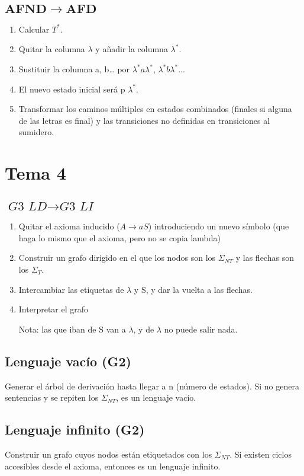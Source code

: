 \documentclass[12pt, twoside, openright]{report} %
\begin{document}
\subsection{$\boldsymbol{AFND \rightarrow AFD}$}
\begin{enumerate}
	\item Calcular $T^*$.
	\item Quitar la columna $\lambda$ y añadir la columna $\lambda^*$.
	\item Sustituir la columna a, b… por $\lambda^* a \lambda^*$, $\lambda^* b \lambda^*$...
	\item El nuevo estado inicial será p $\lambda^*$.
	\item Transformar los caminos múltiples en estados combinados (finales si alguna de las letras es final) y las transiciones no definidas en transiciones al sumidero.
\end{enumerate}

\section{Tema 4}
\subsection{$\boldsymbol{\textit{G3 LD} \rightarrow \textit{G3 LI}}$}
\begin{enumerate}
	\item Quitar el axioma inducido ($A \rightarrow aS$) introduciendo un nuevo símbolo (que haga lo mismo que el axioma, pero no se copia lambda)
	\item Construir un grafo dirigido en el que los nodos son los $\Sigma_{NT}$ y las flechas son los $\Sigma_T$.
	\item Intercambiar las etiquetas de $\lambda$ y S, y dar la vuelta a las flechas.
	\item Interpretar el grafo

	      Nota: las que iban de S van a $\lambda$, y de $\lambda$ no puede salir nada.
\end{enumerate}

\subsection{Lenguaje vacío (G2)}
Generar el árbol de derivación hasta llegar a n (número de estados). Si no genera
sentencias y se repiten los $\Sigma_{NT}$, es un lenguaje vacío.

\subsection{Lenguaje infinito (G2)}
Construir un grafo cuyos nodos están etiquetados con los $\Sigma_{NT}$. Si existen ciclos
accesibles desde el axioma, entonces es un lenguaje infinito.
\end{document}
